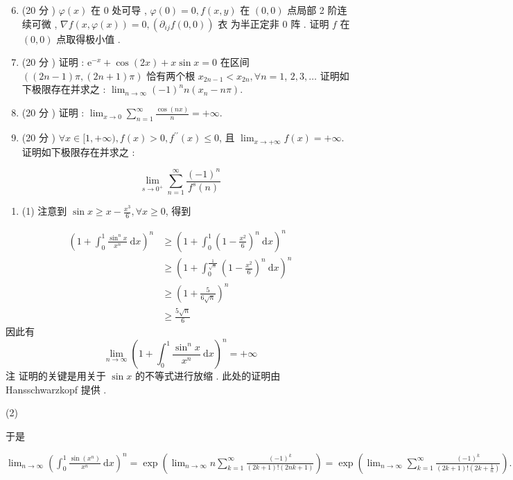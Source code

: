 \documentclass[10pt]{article}
\begin{document}
\begin{enumerate}
  \setcounter{enumi}{5}
  \item (20  分 ) $\varphi(x)$  在  0  处可导 , $\varphi(0)=0, f(x, y)$  在  $(0,0)$  点局部  2  阶连续可微 , $\nabla f(x, \varphi(x))=0,\left(\partial_{i j} f(0,0)\right)$  衣   为半正定非  0  阵 .  证明  $f$  在  $(0,0)$  点取得极小值 .

  \item (20  分 )  证明 : $\mathrm{e}^{-x}+\cos (2 x)+x \sin x=0$  在区间  $((2 n-1) \pi,(2 n+1) \pi)$  恰有两个根  $x_{2 n-1}<x_{2 n}, \forall n=1$, $2,3, \ldots$  证明如下极限存在并求之 : $\lim _{n \rightarrow \infty}(-1)^{n} n\left(x_{n}-n \pi\right)$.

  \item (20  分 )  证明 : $\lim _{x \rightarrow 0} \sum_{n=1}^{\infty} \frac{\cos (n x)}{n}=+\infty$.

  \item (20  分 ) $\forall x \in[1,+\infty), f(x)>0, f^{\prime \prime}(x) \leqslant 0$,  且  $\lim _{x \rightarrow+\infty} f(x)=+\infty$.  证明如下极限存在并求之 :

\end{enumerate}
$$
\lim _{s \rightarrow 0^{+}} \sum_{n=1}^{\infty} \frac{(-1)^{n}}{f^{s}(n)}
$$

\begin{enumerate}
  \item (1)  注意到  $\sin x \geqslant x-\frac{x^{3}}{6}, \forall x \geqslant 0$,  得到 
\end{enumerate}
$$
\begin{aligned}
\left(1+\int_{0}^{1} \frac{\sin ^{n} x}{x^{n}} \mathrm{~d} x\right)^{n} & \geqslant\left(1+\int_{0}^{1}\left(1-\frac{x^{2}}{6}\right)^{n} \mathrm{~d} x\right)^{n} \\
& \geqslant\left(1+\int_{0}^{\frac{1}{\sqrt{n}}}\left(1-\frac{x^{2}}{6}\right)^{n} \mathrm{~d} x\right)^{n} \\
& \geqslant\left(1+\frac{5}{6 \sqrt{n}}\right)^{n} \\
& \geqslant \frac{5 \sqrt{n}}{6}
\end{aligned}
$$
 因此有 
$$
\lim _{n \rightarrow \infty}\left(1+\int_{0}^{1} \frac{\sin ^{n} x}{x^{n}} \mathrm{~d} x\right)^{n}=+\infty
$$
 注   证明的关键是用关于  $\sin x$  的不等式进行放缩 .  此处的证明由  Hansschwarzkopf  提供 .

(2)

 于是 

$\lim _{n \rightarrow \infty}\left(\int_{0}^{1} \frac{\sin \left(x^{n}\right)}{x^{n}} \mathrm{~d} x\right)^{n}=\exp \left(\lim _{n \rightarrow \infty} n \sum_{k=1}^{\infty} \frac{(-1)^{k}}{(2 k+1) !(2 n k+1)}\right)=\exp \left(\lim _{n \rightarrow \infty} \sum_{k=1}^{\infty} \frac{(-1)^{k}}{(2 k+1) !\left(2 k+\frac{1}{n}\right)}\right) .$
\end{document}
